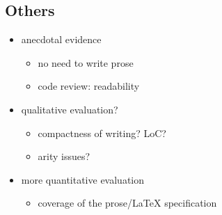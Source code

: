 \subsection{Others}
\begin{itemize}
\item anecdotal evidence
\begin{itemize}
\item no need to write prose
\item code review: readability
\end{itemize}

\item qualitative evaluation?
\begin{itemize}
\item compactness of writing? LoC?
\item arity issues?
\end{itemize}

\item more quantitative evaluation
\begin{itemize}
\item coverage of the prose/LaTeX specification
\end{itemize}
\end{itemize}
